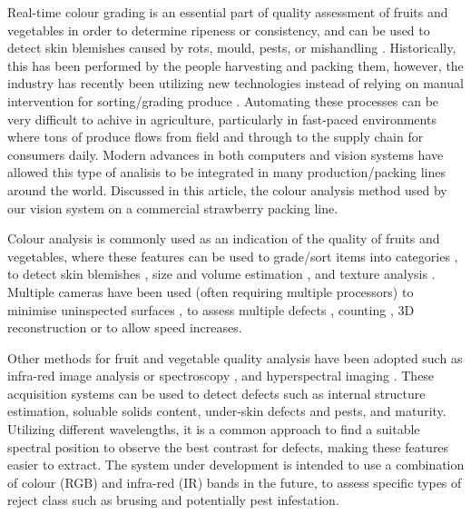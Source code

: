 \documentclass[fleqn,twoside]{article}
\begin{document}
Real-time colour grading is an essential part of quality assessment of fruits and vegetables in order to determine ripeness or consistency, and can be used to detect skin blemishes caused by rots, mould, pests, or mishandling \cite{blasco3}. Historically, this has been performed by the people harvesting and packing them, however, the industry has recently been utilizing new technologies instead of relying on manual intervention for sorting/grading produce \cite{londhe}. Automating these processes can be very difficult to achive in agriculture, particularly in fast-paced environments where tons of produce flows from field and through to the supply chain for consumers daily. Modern advances in both computers and vision systems have allowed this type of analisis to be integrated in many production/packing lines around the world. Discussed in this article, the colour analysis method used by our vision system on a commercial strawberry packing line.

Colour analysis is commonly used as an indication of the quality of fruits and vegetables, where these features can be used to grade/sort items into categories \cite{jun, elmasry3}, to detect skin blemishes \cite{blasco3, leemans}, size and volume estimation \cite{bundit, elmasry3}, and texture analysis \cite{jun, rakun}. Multiple cameras have been used (often requiring multiple processors) to minimise uninspected surfaces \cite{zouxiao, qingzhong}, to assess multiple defects \cite{blasco4}, counting \cite{song}, 3D reconstruction \cite{panitnat} or to allow speed increases\cite{reece}.   

Other methods for fruit and vegetable quality analysis have been adopted such as infra-red image analysis or spectroscopy \cite{guthrie, bureau, yande}, and hyperspectral imaging \cite{renfu} \cite{jianwei, mendoza, rajkumar}. These acquisition systems can be used to detect defects such as internal structure estimation, soluable solids content, under-skin defects and pests, and maturity. Utilizing different wavelengths, it is a common approach to find a suitable spectral position to observe the best contrast for defects, making these features easier to extract\cite{ariana, piotr}. The system under development is intended to use a combination of colour (RGB) and infra-red (IR) bands in the future, to assess specific types of reject class such as brusing and potentially pest infestation. 
\end{document}
